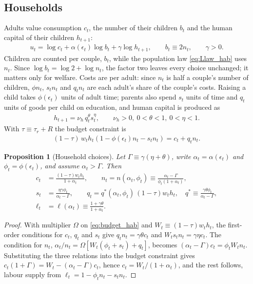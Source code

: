 \documentclass[11pt]{article}
\newtheorem{proposition}{Proposition}
\begin{document}
\subsection{Households}
Adults value consumption $c_t$, the number of their children $b_t$ and the human capital of their
children $h_{t+1}$:
\begin{align}
u_t=\log c_t+\alpha(\epsilon_t)\log b_t+\gamma\log h_{t+1},\qquad b_t\equiv2n_t,\qquad \gamma>0 .
\label{eq:util_hab}
\end{align}
Children are counted per couple, $b_t$, while the population law \eqref{eq:Llaw_hab} uses $n_t$. Since
$\log b_t=\log2+\log n_t$, the factor two leaves every choice unchanged; it matters only for welfare.
Costs are per adult: since $n_t$ is half a couple's number of children, $\phi n_t$, $s_tn_t$ and $q_tn_t$
are each adult's share of the couple's costs. Raising a child takes $\phi(\epsilon_t)$ units of adult time; parents also spend $s_t$ units of time and
$q_t$ units of goods per child on education, and human capital is produced as
\begin{align}
h_{t+1}=\nu_h\,q_t^{\theta}s_t^{\eta},\qquad \nu_h>0,\ 0<\theta<1,\ 0<\eta<1 .
\label{eq:hc_hab}
\end{align}
With $\tau\equiv\tau_r+R$ the budget constraint is
\begin{align}
(1-\tau)\,w_th_t\left(1-\phi(\epsilon_t)n_t-s_tn_t\right)=c_t+q_tn_t .
\label{eq:budget_hab}
\end{align}

\begin{proposition}[Household choices]
\label{prop:hab_solution}
Let $\Gamma\equiv\gamma(\eta+\theta)$, write $\alpha_t=\alpha(\epsilon_t)$ and $\phi_t=\phi(\epsilon_t)$, and
assume $\alpha_t>\Gamma$. Then
\begin{align}
c_t&=\frac{(1-\tau)w_th_t}{1+\alpha_t},
\qquad
n_t=n(\alpha_t,\phi_t)\equiv\frac{\alpha_t-\Gamma}{\phi_t(1+\alpha_t)},
\label{eq:sol_n_hab}\\
s_t&=\frac{\eta\gamma\phi_t}{\alpha_t-\Gamma},
\qquad
q_t=q^\ast(\alpha_t,\phi_t)\,(1-\tau)w_th_t,\quad q^\ast\equiv\frac{\gamma\theta\phi_t}{\alpha_t-\Gamma},
\label{eq:sol_q_hab}\\
\ell_t&=\ell(\alpha_t)\equiv\frac{1+\gamma\theta}{1+\alpha_t}.
\label{eq:sol_l_hab}
\end{align}
\end{proposition}

\begin{proof}
With multiplier $\Omega$ on \eqref{eq:budget_hab} and $W_t\equiv(1-\tau)w_th_t$, the first-order
conditions for $c_t$, $q_t$ and $s_t$ give $q_tn_t=\gamma\theta c_t$ and $W_ts_tn_t=\gamma\eta c_t$. The
condition for $n_t$, $\alpha_t/n_t=\Omega[W_t(\phi_t+s_t)+q_t]$, becomes
$(\alpha_t-\Gamma)c_t=\phi_tW_tn_t$. Substituting the three relations into the budget constraint gives
$c_t(1+\Gamma)=W_t-(\alpha_t-\Gamma)c_t$, hence $c_t=W_t/(1+\alpha_t)$, and the rest follows, labour
supply from $\ell_t=1-\phi_tn_t-s_tn_t$.
\end{proof}
\end{document}
